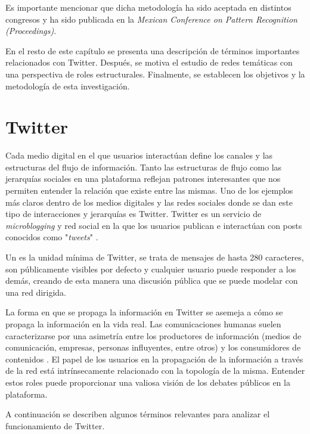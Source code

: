 Es importante mencionar que dicha metodología ha sido aceptada en distintos congresos y ha sido publicada en la \textit{Mexican Conference on Pattern Recognition (Proceedings)}.

En el resto de este capítulo se presenta una descripción de términos importantes relacionados con Twitter. Después, se motiva el estudio de redes temáticas con una perspectiva de roles estructurales. Finalmente, se establecen los objetivos y la metodología de esta investigación. 

\section{Twitter} 

Cada medio digital en el que usuarios interactúan define los canales y las estructuras del flujo de información. Tanto las estructuras de flujo como las jerarquías sociales en una plataforma reflejan patrones interesantes que nos permiten entender la relación que existe entre las mismas. Uno de los ejemplos más claros dentro de los medios digitales y las redes sociales donde se dan este tipo de interacciones y jerarquías es Twitter. Twitter es un servicio de \textit{microblogging} y red social en la que los usuarios publican e interactúan con posts conocidos como "\textit{tweets}" \cite{twitter_twittercom_nodate}. 

Un \tweet es la unidad mínima de Twitter, se trata de mensajes de hasta 280 caracteres, son públicamente visibles por defecto y cualquier usuario puede responder a los demás, creando de esta manera una discusión pública que se puede modelar con una red dirigida.

La forma en que se propaga la información en Twitter se asemeja a cómo se propaga la información en la vida real. Las comunicaciones humanas suelen caracterizarse por una asimetría entre los productores de información (medios de comunicación, empresas, personas influyentes, entre otros) y los consumidores de contenidos \cite{gabielkov_studying_2014}. El papel de los usuarios en la propagación de la información a través de la red está intrínsecamente relacionado con la topología de la misma. Entender estos roles puede proporcionar una valiosa visión de los debates públicos en la plataforma. 

A continuación se describen algunos términos relevantes para analizar el funcionamiento de Twitter. 



